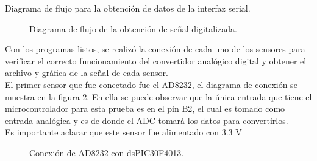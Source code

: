 Diagrama de flujo para la obtención de datos de la interfaz serial.
	\begin{figure}[htbp!]
		\centering
		\caption{Diagrama de flujo de la obtención de señal digitalizada.}
		\label{fig:FlujoSerial}
	\end{figure}
\pagebreak
		
Con los programas listos, se realizó la conexión de cada uno de los sensores para verificar el  correcto funcionamiento del convertidor analógico digital y obtener el archivo y gráfica de la señal de cada sensor.\\

El primer sensor que fue conectado fue el AD8232, el diagrama de conexión se muestra en la figura \ref{fig:ConexionAD8232}. En ella se puede observar que la única entrada que tiene el microcontrolador para esta prueba es en el pin B2, el cual es tomado como entrada analógica y es de donde el ADC tomará los datos para convertirlos.\\

Es importante aclarar que este sensor fue alimentado con 3.3 V

	\begin{figure}[htbp!]
		\centering
		\caption{Conexión de AD8232 con dsPIC30F4013.}
		\label{fig:ConexionAD8232}
	\end{figure}
	
